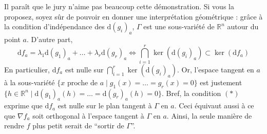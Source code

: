 	\begin{remark}
		Il paraît que le jury n'aime pas beaucoup cette démonstration. Si vous la proposez, soyez sûr de pouvoir en donner une interprétation géométrique : grâce à la condition d'indépendance des $\mathrm{d}(g_i)_a$, $\Gamma$ est une sous-variété de $\mathbb{R}^n$ autour du point $a$. D'autre part,
		\[ \mathrm{d}f_a = \lambda_1 \mathrm{d}(g_1)_a + \dots + \lambda_r \mathrm{d}(g_r)_a \iff \bigcap_{i=1}^r \ker(\mathrm{d}(g_i)_a) \subset \ker(\mathrm{d}f_a) \tag{$*$} \]
		En particulier, $\mathrm{d}f_a$ est nulle sur $\bigcap_{i=1}^r \ker(\mathrm{d}(g_i)_a)$. Or, l'espace tangent en $a$ à la sous-variété $\{ x \text{ proche de } a \mid g_1(x) = \dots = g_r(x) = 0 \}$ est justement $\{ h \in \mathbb{R}^n \mid \mathrm{d}(g_1)_a(h) = \dots = \mathrm{d}(g_r)_a(h) = 0 \}$.
		\newpar
		Bref, la condition $(*)$ exprime que $\mathrm{d}f_a$ est nulle sur le plan tangent à $\Gamma$ en $a$. Ceci équivaut aussi à ce que $\nabla f_a$ soit orthogonal à l'espace tangent à $\Gamma$ en $a$. Ainsi, la seule manière de rendre $f$ plus petit serait de ``sortir de $\Gamma$''.
	\end{remark}

